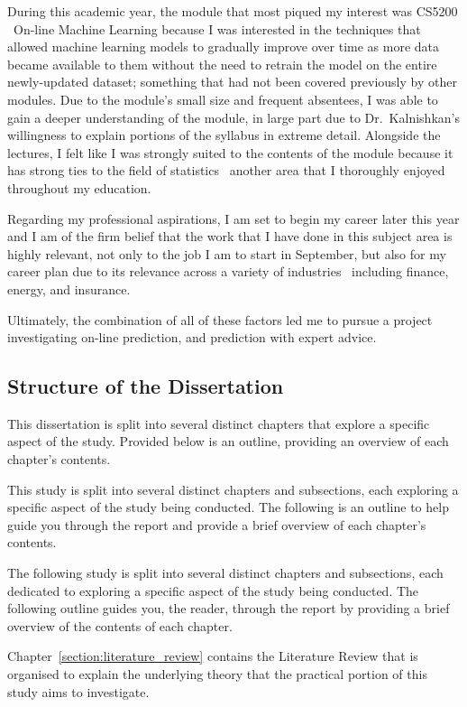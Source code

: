 During this academic year, the module that most piqued my interest was CS5200 \textendash\ On-line Machine Learning because I was interested in the techniques that allowed machine learning models to gradually improve over time as more data became available to them without the need to retrain the model on the entire newly-updated dataset; something that had not been covered previously by other modules. Due to the module's small size and frequent absentees, I was able to gain a deeper understanding of the module, in large part due to Dr.\ Kalnishkan's willingness to explain portions of the syllabus in extreme detail. Alongside the lectures, I felt like I was strongly suited to the contents of the module because it has strong ties to the field of statistics \textendash\ another area that I thoroughly enjoyed throughout my education.

Regarding my professional aspirations, I am set to begin my career later this year and I am of the firm belief that the work that I have done in this subject area is highly relevant, not only to the job I am to start in September, but also for my career plan due to its relevance across a variety of industries \textendash\ including finance, energy, and insurance.

Ultimately, the combination of all of these factors led me to pursue a project investigating on-line prediction, and prediction with expert advice.

\subsection{Structure of the Dissertation}
This dissertation is split into several distinct chapters that explore a specific aspect of the study. Provided below is an outline, providing an overview of each chapter's contents.

This study is split into several distinct chapters and subsections, each exploring a specific aspect of the study being conducted. The following is an outline to help guide you through the report and provide a brief overview of each chapter's contents.

The following study is split into several distinct chapters and subsections, each dedicated to exploring a specific aspect of the study being conducted. The following outline guides you, the reader, through the report by providing a brief overview of the contents of each chapter.

Chapter~\ref{section:literature_review} contains the Literature Review that is organised to explain the underlying theory that the practical portion of this study aims to investigate.

